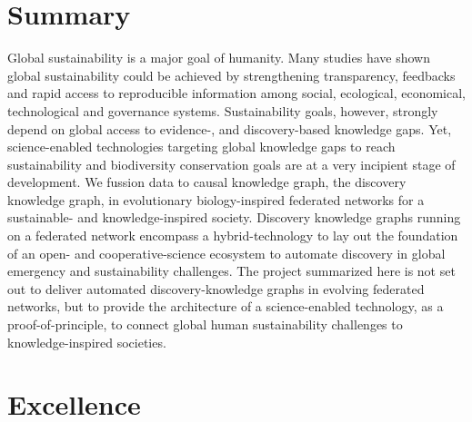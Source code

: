 \documentclass[11pt, a4paper]{article} %
\begin{document}
\section*{{\bf Summary}} Global sustainability is a major goal of
humanity. Many studies have shown global sustainability could be
achieved by strengthening transparency, feedbacks and rapid access to
reproducible information among social, ecological, economical,
technological and governance systems. Sustainability goals, however,
strongly depend on global access to evidence-, and discovery-based
knowledge gaps. Yet, science-enabled technologies targeting global
knowledge gaps to reach sustainability and biodiversity conservation
goals are at a very incipient stage of development. We fussion data to
causal knowledge graph, the discovery knowledge graph, in evolutionary
biology-inspired federated networks for a sustainable- and
knowledge-inspired society. Discovery knowledge graphs running on a
federated network encompass a hybrid-technology to lay out the
foundation of an open- and cooperative-science ecosystem to automate
discovery in global emergency and sustainability challenges. The
project summarized here is not set out to deliver automated
discovery-knowledge graphs in evolving federated networks, but to
provide the architecture of a science-enabled technology, as a
proof-of-principle, to connect global human sustainability challenges
to knowledge-inspired societies.
\section{Excellence}
\end{document}
